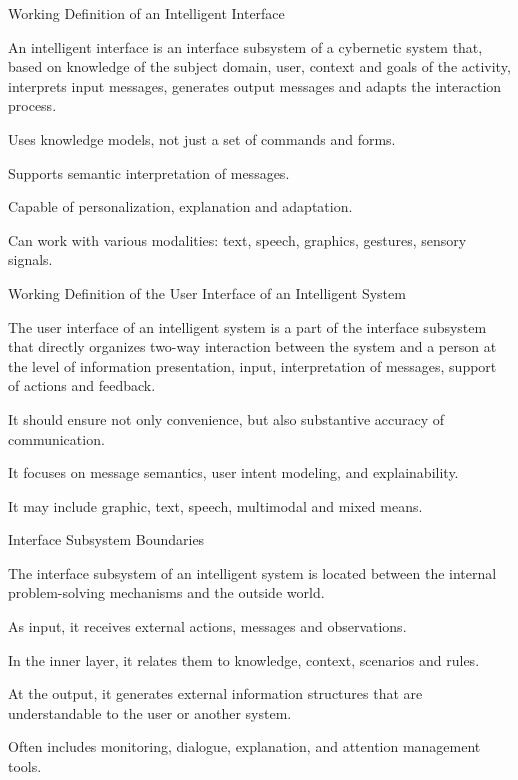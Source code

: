 \begin{frame}{Working Definition of an Intelligent Interface}
	\topline
	\justifying
	
	
	An intelligent interface is an interface subsystem of a cybernetic system that, based on knowledge of the subject domain, user, context and goals of the activity, interprets input messages, generates output messages and adapts the interaction process.
	
	\begin{textitemize}
		\item Uses knowledge models, not just a set of commands and forms.
		\item Supports semantic interpretation of messages.
		\item Capable of personalization, explanation and adaptation.
		\item Can work with various modalities: text, speech, graphics, gestures, sensory signals.
	\end{textitemize}
\end{frame}

\begin{frame}{Working Definition of the User Interface of an Intelligent System}
	\topline
	\justifying
	
	
	The user interface of an intelligent system is a part of the interface subsystem that directly organizes two-way interaction between the system and a person at the level of information presentation, input, interpretation of messages, support of actions and feedback.
	
	\begin{textitemize}
		\item It should ensure not only convenience, but also substantive accuracy of communication.
		\item It focuses on message semantics, user intent modeling, and explainability.
		\item It may include graphic, text, speech, multimodal and mixed means.
	\end{textitemize}
\end{frame}

\begin{frame}{Interface Subsystem Boundaries}
	\topline
	\justifying
	
	
	The interface subsystem of an intelligent system is located between the internal problem-solving mechanisms and the outside world.
	
	\begin{textitemize}
		\item As input, it receives external actions, messages and observations.
		\item In the inner layer, it relates them to knowledge, context, scenarios and rules.
		\item At the output, it generates external information structures that are understandable to the user or another system.
		\item Often includes monitoring, dialogue, explanation, and attention management tools.
	\end{textitemize}
\end{frame}

